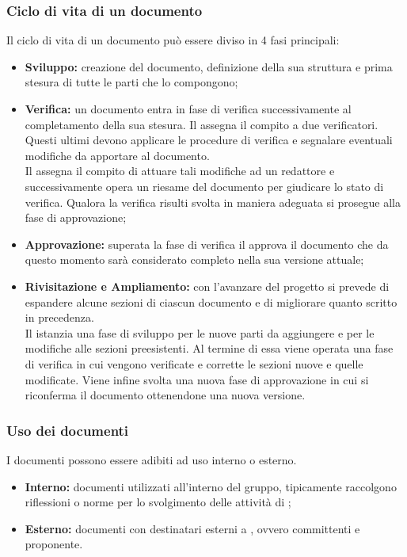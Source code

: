\subsubsection{Ciclo di vita di un documento}
Il ciclo di vita di un documento può essere diviso in 4 fasi principali:
\begin{itemize}
	\item \textbf{Sviluppo:} creazione del documento, definizione della sua struttura e prima stesura di tutte le parti che lo compongono;
	\item \textbf{Verifica:} un documento entra in fase di verifica successivamente al completamento della sua stesura. Il \roleProjectManager{} assegna il compito a due verificatori. Questi ultimi devono applicare le procedure di verifica e segnalare eventuali modifiche da apportare al documento. \\Il \roleProjectManager{} assegna il compito di attuare tali modifiche ad un redattore e successivamente opera un riesame del documento per giudicare lo stato di verifica. Qualora la verifica risulti svolta in maniera adeguata si prosegue alla fase di approvazione;
	\item \textbf{Approvazione:} superata la fase di verifica il \roleProjectManager{} approva il documento che da questo momento sarà considerato completo nella sua versione attuale;
	\item \textbf{Rivisitazione e Ampliamento:} con l'avanzare del progetto si prevede di espandere alcune sezioni di ciascun documento e di migliorare quanto scritto in precedenza. \\Il \roleProjectManager{} istanzia una fase di sviluppo per le nuove parti da aggiungere e per le modifiche alle sezioni preesistenti. Al termine di essa viene operata una fase di verifica in cui vengono verificate e corrette le sezioni nuove e quelle modificate. Viene infine svolta una nuova fase di approvazione in cui si riconferma il documento ottenendone una nuova versione.
\end{itemize}

\subsubsection{Uso dei documenti}
I documenti possono essere adibiti ad uso interno o esterno.
\begin{itemize}
	\item \textbf{Interno:} documenti utilizzati all'interno del gruppo, tipicamente raccolgono riflessioni o norme per lo svolgimento delle attività di \groupName;
	\item \textbf{Esterno:} documenti con destinatari esterni a \groupName, ovvero committenti e proponente.
\end{itemize}


